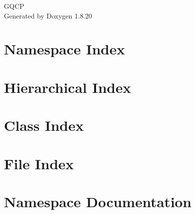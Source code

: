 \let\mypdfximage\pdfximage\def\pdfximage{\immediate\mypdfximage}\documentclass[twoside]{book}
\newcommand{\+}{\discretionary{\mbox{\scriptsize$\hookleftarrow$}}{}{}}
\newcommand{\clearemptydoublepage}{%
  \newpage{\pagestyle{empty}\cleardoublepage}%
}
\begin{document}
\hypersetup{pageanchor=false,
             bookmarksnumbered=true,
             pdfencoding=unicode
            }
\begin{titlepage}
\vspace*{7cm}
\begin{center}%
{\Large G\+Q\+CP }\\
\vspace*{1cm}
{\large Generated by Doxygen 1.8.20}\\
\end{center}
\end{titlepage}
\clearemptydoublepage
{}
\tableofcontents
\clearemptydoublepage
{}
\hypersetup{pageanchor=true}

\chapter{Namespace Index}

\chapter{Hierarchical Index}

\chapter{Class Index}

\chapter{File Index}

\chapter{Namespace Documentation}














\end{document}
